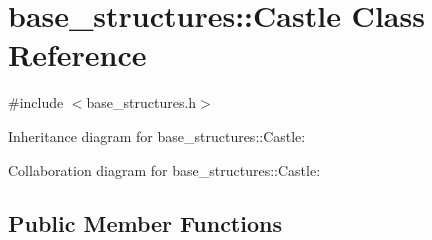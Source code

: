 \hypertarget{classbase__structures_1_1Castle}{}\section{base\+\_\+structures\+:\+:Castle Class Reference}
\label{classbase__structures_1_1Castle}


{\ttfamily \#include $<$base\+\_\+structures.\+h$>$}



Inheritance diagram for base\+\_\+structures\+:\+:Castle\+:


Collaboration diagram for base\+\_\+structures\+:\+:Castle\+:
\subsection*{Public Member Functions}
